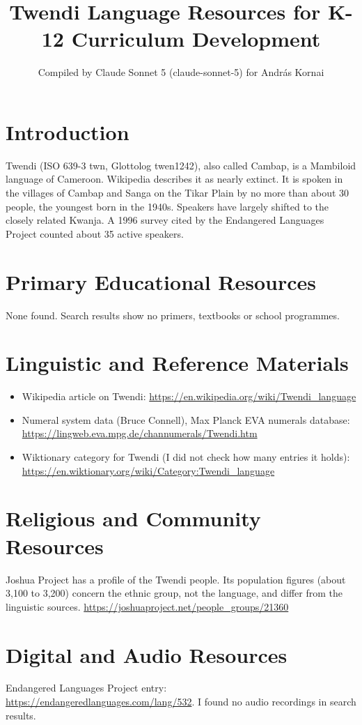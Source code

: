 \documentclass[12pt]{article}
\title{Twendi Language Resources for K-12 Curriculum Development}
\author{Compiled by Claude Sonnet 5 (claude-sonnet-5) for Andr\'as Kornai}
\date{}
\begin{document}
\maketitle

\section{Introduction}
Twendi (ISO 639-3 twn, Glottolog twen1242), also called Cambap, is a Mambiloid language of Cameroon. Wikipedia describes it as nearly extinct. It is spoken in the villages of Cambap and Sanga on the Tikar Plain by no more than about 30 people, the youngest born in the 1940s. Speakers have largely shifted to the closely related Kwanja. A 1996 survey cited by the Endangered Languages Project counted about 35 active speakers.

\section{Primary Educational Resources}
None found. Search results show no primers, textbooks or school programmes.

\section{Linguistic and Reference Materials}
\begin{itemize}
\item Wikipedia article on Twendi: \url{https://en.wikipedia.org/wiki/Twendi_language}
\item Numeral system data (Bruce Connell), Max Planck EVA numerals database: \url{https://lingweb.eva.mpg.de/channumerals/Twendi.htm}
\item Wiktionary category for Twendi (I did not check how many entries it holds): \url{https://en.wiktionary.org/wiki/Category:Twendi_language}
\end{itemize}

\section{Religious and Community Resources}
Joshua Project has a profile of the Twendi people. Its population figures (about 3,100 to 3,200) concern the ethnic group, not the language, and differ from the linguistic sources. \url{https://joshuaproject.net/people_groups/21360}

\section{Digital and Audio Resources}
Endangered Languages Project entry: \url{https://endangeredlanguages.com/lang/532}. I found no audio recordings in search results.
\end{document}
